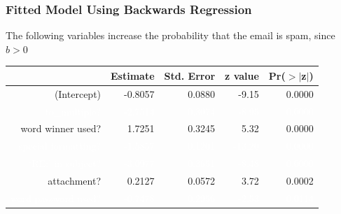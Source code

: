 \documentclass[slides]{beamer}
\newcommand{\blue}[1]{\textcolor{blue2}{#1}}
\newcommand{\white}[1]{\textcolor{white}{#1}}
\begin{document}
\begin{frame}[fragile]
\frametitle{Fitted Model Using Backwards Regression}
The following variables increase the probability that the email is spam, since $b>0$

\begin{table}[ht]
\centering
\begin{tabular}{r|rrrr}
  \hline
 & Estimate & Std. Error & z value & Pr($>$$|$z$|$) \\ 
  \hline
(Intercept) & -0.8057 & 0.0880 & -9.15 & 0.0000 \\ 
  \white{to\_multiple?} & \white{-2.7514} & \white{0.3074} & \white{-8.95} & \white{0.0000} \\ 
  \blue{word winner used?} & \blue{1.7251} & \blue{0.3245} & \blue{5.32} & \blue{0.0000} \\ 
  \white{special formatting?} & \white{-1.5857} & \white{0.1201} & \white{-13.20} & \white{0.0000} \\ 
  \white{`RE:' in subject?} & \white{-3.0977} & \white{0.3651} & \white{-8.48} & \white{0.0000} \\ 
  \blue{attachment?} & \blue{0.2127} & \blue{0.0572} & \blue{3.72} & \blue{0.0002} \\ 
  \white{word password used?} & \white{-0.7478} & \white{0.2956} & \white{-2.53} & \white{0.0114} \\ 
   \hline
\end{tabular}
\end{table} 

\end{frame}
\end{document}
